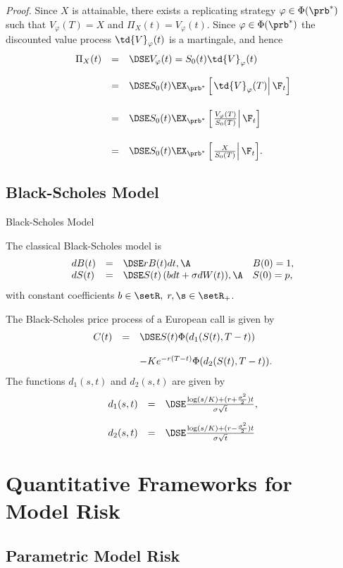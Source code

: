 {\it Proof.} Since $X$ is
attainable, there exists a replicating strategy $\varphi \in
\Phi(\prb^*)$ such that $V_\varphi(T) = X$ and $\Pi_X(t) =
V_\varphi(t)$. Since $\varphi \in \Phi(\prb^*)$ the discounted
value process $\td{V}_\varphi(t)$ is a martingale, and hence
$$
\begin{array}{lll}
\Pi_X(t) &=&\DSE V_\varphi(t) = S_0(t)\td{V}_\varphi(t) \\*[12pt]
&=&\DSE S_0(t) \EX_{\prb^*}
\left[\left.\td{V}_\varphi(T)\right|\F_t\right]\\*[18pt]
&=&\DSE S_0(t)
\EX_{\prb^*}
\left[\left.\frac{V_\varphi(T)}{S_0(T)}\right|\F_t\right]\\*[18pt]
&=&\DSE S_0(t) \EX_{\prb^*}
\left[\left.\frac{X}{S_0(T)}\right|\F_t\right]\!.
\end{array}
$$
\hfill \eb

\subsection{Black-Scholes Model}

{ Black-Scholes Model}

The classical Black-Scholes model is
$$
\begin{array}{llll}
dB(t) &=&\DSE r B(t) dt, \A &B(0)= 1,\\ dS(t) &=&\DSE S(t) \left(
b dt + \sigma dW(t) \right)\!, \A &S(0) = p,
\end{array}
$$
with constant coefficients $b \in \setR,\; r,\s \in \setR_+$.

The Black-Scholes price pro\-cess of a European call is given by
$$
\begin{array}{lll}
C(t) &=&\DSE S(t) \Phi(d_1(S(t), T-t))\\*[12pt] &&- K e^{-r(T-t)}
\Phi(d_2(S(t), T-t)).
\end{array}
$$
The functions $d_1(s,t)$ and $d_2(s,t)$ are given by
$$
\begin{array}{lll}
d_1(s,t) &=&\DSE \frac{\log(s/K) + (r +
\frac{\sigma^2}{2})t}{\sigma \sqrt{t}},\\*[12pt] d_2(s,t) &=&\DSE
 \frac{\log(s/K) + (r -
\frac{\sigma^2}{2})t}{\sigma \sqrt{t}}
\end{array}
$$

\section{Quantitative Frameworks for Model Risk}
\subsection{Parametric Model Risk}

